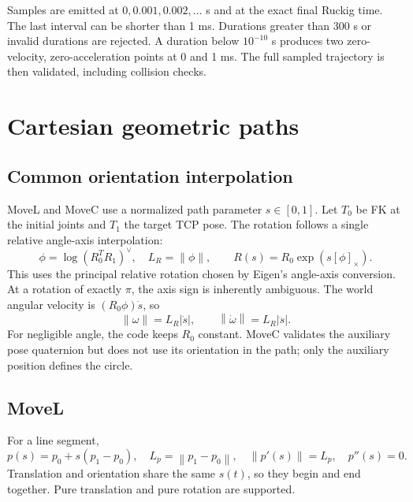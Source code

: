 \documentclass[11pt,a4paper]{report}
\newcommand{\norm}[1]{\left\lVert#1\right\rVert}
\newcommand{\skew}[1]{[#1]_{\times}}
\begin{document}
Samples are emitted at $0,0.001,0.002,\ldots$ s and at the exact final
Ruckig time. The last interval can be shorter than 1 ms. Durations greater
than 300 s or invalid durations are rejected. A duration below $10^{-10}$ s
produces two zero-velocity, zero-acceleration points at 0 and 1 ms. The full
sampled trajectory is then validated, including collision checks.

\section{Cartesian geometric paths}
\subsection{Common orientation interpolation}
MoveL and MoveC use a normalized path parameter $s\in[0,1]$. Let $T_0$ be
FK at the initial joints and $T_1$ the target TCP pose. The rotation follows
a single relative angle-axis interpolation:
\begin{equation}
 \phi=\log(R_0^TR_1)^\vee,\quad L_R=\norm{\phi},\qquad
 R(s)=R_0\exp(s\skew{\phi}).
 \label{eq:orientation}
\end{equation}
This uses the principal relative rotation chosen by Eigen's angle-axis
conversion. At a rotation of exactly $\pi$, the axis sign is inherently
ambiguous. The world angular velocity is $(R_0\phi)\dot s$, so
\begin{equation}
 \norm{\omega}=L_R|\dot s|,\qquad
 \norm{\dot\omega}=L_R|\ddot s|.
\end{equation}
For negligible angle, the code keeps $R_0$ constant. MoveC validates the
auxiliary pose quaternion but does not use its orientation in the path;
only the auxiliary position defines the circle.

\subsection{MoveL}
For a line segment,
\begin{equation}
 p(s)=p_0+s(p_1-p_0),\quad
 L_p=\norm{p_1-p_0},\quad
 \norm{p'(s)}=L_p,\quad p''(s)=0.
\end{equation}
Translation and orientation share the same $s(t)$, so they begin and end
together. Pure translation and pure rotation are supported.
\end{document}

